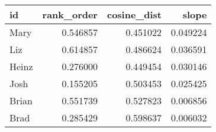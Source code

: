 \begin{tabular}{lrrr}
\toprule
id & rank_order & cosine_dist & slope \\
\midrule
Mary & 0.546857 & 0.451022 & 0.049224 \\
Liz & 0.614857 & 0.486624 & 0.036591 \\
Heinz & 0.276000 & 0.449454 & 0.030146 \\
Josh & 0.155205 & 0.503453 & 0.025425 \\
Brian & 0.551739 & 0.527823 & 0.006856 \\
Brad & 0.285429 & 0.598637 & 0.006032 \\
\bottomrule
\end{tabular}
